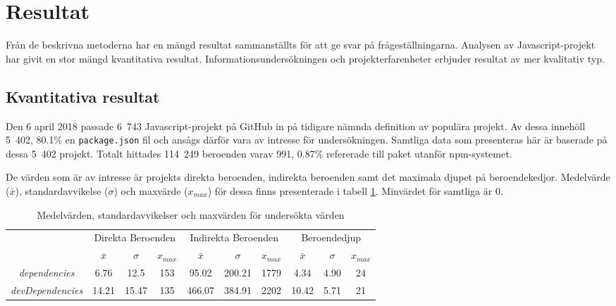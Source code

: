 \section{Resultat}
\label{sec:joel_o-results}
Från de beskrivna metoderna har en mängd resultat sammanställts för att ge svar på frågeställningarna. Analysen av Javascript-projekt har givit en stor mängd kvantitativa resultat. Informationsundersökningen och projekterfarenheter erbjuder resultat av mer kvalitativ typ.

\subsection{Kvantitativa resultat}
\label{sec:joel_o-results-kvant}
Den 6 april 2018 passade 6~743 Javascript-projekt på GitHub in på tidigare nämnda definition av populära projekt. Av dessa innehöll 5~402, 80.1\% en \texttt{package.json} fil och ansågs därför vara av intresse för undersökningen. Samtliga data som presenteras här är baserade på dessa 5~402 projekt. Totalt hittades 114~249 beroenden varav 991, 0.87\% refererade till paket utanför npm-systemet.

De värden som är av intresse är projekts direkta beroenden, indirekta beroenden samt det maximala djupet på beroendekedjor. Medelvärde ($\bar{x}$), standardavvikelse ($\sigma$) och maxvärde ($x_{max}$) för dessa finns presenterade i tabell \ref{tab:beroende-data}. Minvärdet för samtliga är 0.

\begin{table}[H]
  \centering
  \begin{tabular}{c | c c c | c c c | c c c |}
    \cline{2-10}
    & \multicolumn{3}{c|}{Direkta Beroenden} & \multicolumn{3}{c|}{Indirekta Beroenden} & \multicolumn{3}{c|}{Beroendedjup} \\ \cline{2-10}
    & $\bar{x}$ & $\sigma$ & $x_{max}$ & $\bar{x}$ & $\sigma$ & $x_{max}$ & $\bar{x}$ & $\sigma$ & $x_{max}$ \\ \hline
    \multicolumn{1}{|c|}{\textit{dependencies}} & 6.76 & 12.5 & 153 & 95.02 & 200.21 & 1779 & 4.34 & 4.90 & 24 \\ \hline
    \multicolumn{1}{|c|}{\textit{devDependencies}} & 14.21 & 15.47 & 135 & 466.07 & 384.91 & 2202 & 10.42 & 5.71 & 21 \\
    \hline
  \end{tabular}
  \caption{Medelvärden, standardavvikelser och maxvärden för undersökta värden}
  \label{tab:beroende-data}
\end{table}

